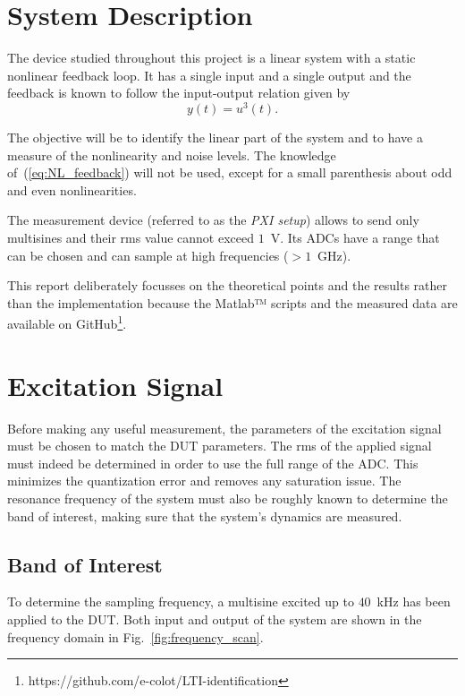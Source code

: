 \section{System Description}

The device studied throughout this project is a linear system with a static nonlinear feedback loop. It has a single input and a single output and the feedback is known to follow the input-output relation given by
\begin{equation}
    y(t) = u^3(t).
    \label{eq:NL_feedback}
\end{equation}

The objective will be to identify the linear part of the system and to have a measure of the nonlinearity and noise levels. The knowledge of~(\ref{eq:NL_feedback}) will not be used, except for a small parenthesis about odd and even nonlinearities.

The measurement device (referred to as the \textit{PXI setup}) allows to send only multisines and their rms value cannot exceed $1$~V. Its ADCs have a range that can be chosen and can sample at high frequencies ($> 1$~GHz).

This report deliberately focusses on the theoretical points and the results rather than the implementation because the Matlab™ scripts and the measured data are available on GitHub\footnote{https://github.com/e-colot/LTI-identification}. 





\section{Excitation Signal}

Before making any useful measurement, the parameters of the excitation signal must be chosen to match the DUT parameters. The rms of the applied signal must indeed be determined in order to use the full range of the ADC. This minimizes the quantization error and removes any saturation issue. The resonance frequency of the system must also be roughly known to determine the band of interest, making sure that the system's dynamics are measured.



\subsection{Band of Interest}
\label{sec:Band_of_interest}

To determine the sampling frequency, a multisine excited up to $40$~kHz has been applied to the DUT. Both input and output of the system are shown in the frequency domain in Fig.~\ref{fig:frequency_scan}.


